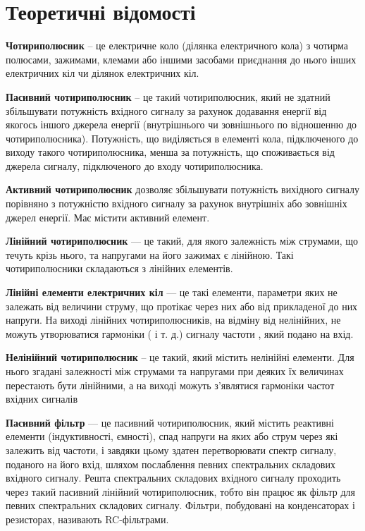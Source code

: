 \documentclass[
  ukrainian,
  14pt
]{extreport}
\begin{document}
\section{Теоретичні відомості}
\textbf{Чотириполюсник} -- це електричне коло (ділянка електричного кола) з чотирма
полюсами, зажимами, клемами або іншими засобами приєднання до нього інших електричних кіл чи ділянок електричних кіл.

\textbf{Пасивний чотириполюсник} -- це такий чотириполюсник, який не здатний
збільшувати потужність вхідного сигналу за рахунок додавання енергії від якогось іншого джерела енергії (внутрішнього чи зовнішнього по відношенню до чотириполюсника).
Потужність, що виділяється в елементі кола, підключеного до виходу такого чотириполюсника, менша за потужність, що споживається від джерела сигналу, підключеного до
входу чотириполюсника.

\textbf{Активний чотириполюсник} дозволяє збільшувати потужність вихідного сигналу порівняно з потужністю вхідного сигналу за рахунок внутрішніх або зовнішніх
джерел енергії. Має містити активний елемент.

\textbf{Лінійний чотириполюсник} — це такий, для якого залежність між струмами,
що течуть крізь нього, та напругами на його зажимах є лінійною. Такі чотириполюсники
складаються з лінійних елементів.

\textbf{Лінійні елементи електричних кіл }— це такі елементи, параметри яких не залежать від величини струму, що протікає через них або від прикладеної до них напруги.
На виході лінійних чотириполюсників, на відміну від нелінійних, не можуть утворюватися гармоніки ( і т. д.) сигналу частоти , який подано на вхід.

\textbf{Нелінійний чотириполюсник} – це такий, який містить нелінійні елементи.
Для нього згадані залежності між струмами та напругами при деяких їх величинах
перестають бути лінійними, а на виході можуть з’являтися гармоніки частот вхідних
сигналів

\textbf{Пасивний фільтр} — це пасивний чотириполюсник, який містить реактивні
елементи (індуктивності, ємності), спад напруги на яких або струм через які залежить від частоти, і завдяки цьому здатен перетворювати спектр сигналу, поданого на його вхід, шляхом послаблення певних спектральних складових вхідного сигналу. Решта
спектральних складових вхідного сигналу проходить через такий пасивний лінійний чотириполюсник, тобто він працює як фільтр для певних спектральних складових сигналу.
Фільтри, побудовані на конденсаторах і резисторах, називають RC-фільтрами.
\end{document}
